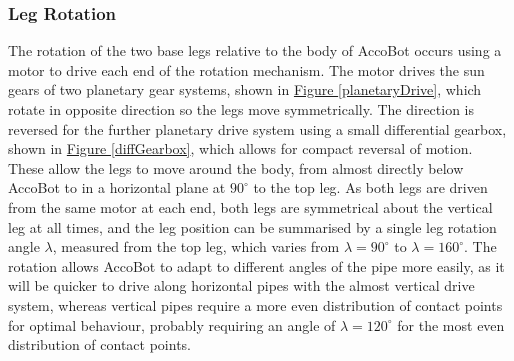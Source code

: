 \documentclass[11pt]{article}		%
\newcommand{\figref}[1]{\hyperref[#1]{Figure \ref*{#1}}}    %
\begin{document}
			\subsubsection{Leg Rotation}
				
				The rotation of the two base legs relative to the body of AccoBot occurs using a motor to drive each end of the rotation mechanism.
				The motor drives the sun gears of two planetary gear systems, shown in \figref{planetaryDrive}, which rotate in opposite direction so the legs move symmetrically.
				The direction is reversed for the further planetary drive system using a small differential gearbox, shown in \figref{diffGearbox}, which allows for compact reversal of motion.
				These allow the legs to move around the body, from almost directly below AccoBot to in a horizontal plane at $90^\circ$ to the top leg.
				As both legs are driven from the same motor at each end, both legs are symmetrical about the vertical leg at all times, and the leg position can be summarised by a single leg rotation angle $\lambda$, measured from the top leg, which varies from $\lambda = 90^\circ$ to $\lambda = 160^\circ$.
				The rotation allows AccoBot to adapt to different angles of the pipe more easily, as it will be quicker to drive along horizontal pipes with the almost vertical drive system, whereas vertical pipes require a more even distribution of contact points for optimal behaviour, probably requiring an angle of $\lambda = 120^\circ$ for the most even distribution of contact points.
										
\end{document}

